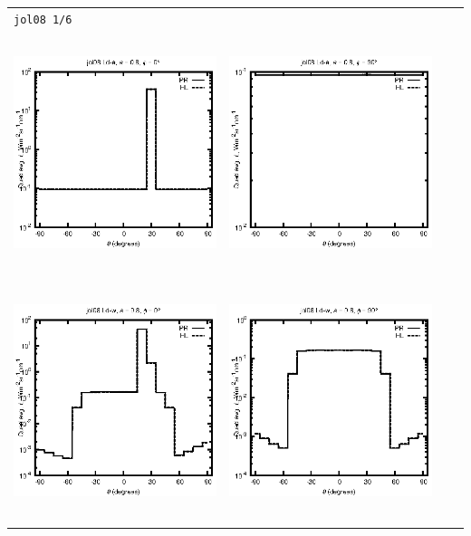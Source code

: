 \begin{tabular}{c c c c}
\multicolumn{4}{l}{\texttt{jol08 1/6}} \\
\includegraphics[height=7cm]{../eps/jol08_Ld_a_fwd.eps} &
\includegraphics[height=7cm]{../eps/jol08_Ld_a_cross.eps}\\
\includegraphics[height=7cm]{../eps/jol08_Ld_w_fwd.eps} &
\includegraphics[height=7cm]{../eps/jol08_Ld_w_cross.eps} \\

\end{tabular}

